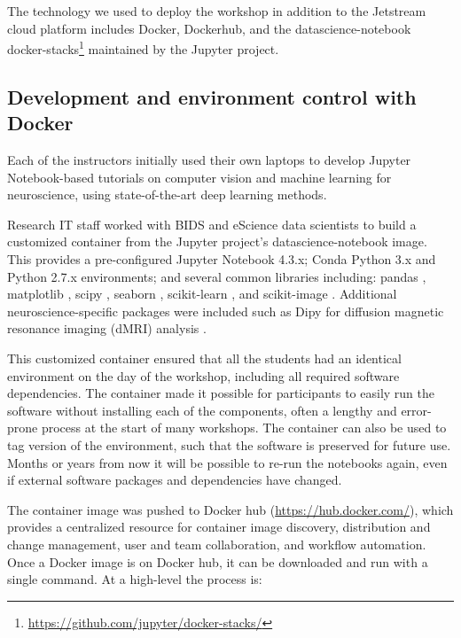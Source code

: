 The technology we used to deploy the workshop in addition to the Jetstream cloud
platform includes Docker, Dockerhub, and the datascience-notebook docker-stacks\footnote{\url{https://github.com/jupyter/docker-stacks/}}
maintained by the Jupyter project.

\subsection{Development and environment control with Docker}

Each of the instructors initially used their own laptops to develop Jupyter
Notebook-based tutorials on computer vision and machine learning for
neuroscience, using state-of-the-art deep learning methods.

Research IT staff worked with BIDS and eScience data scientists to build a
customized container from the Jupyter project's datascience-notebook image. This
provides a pre-configured Jupyter Notebook 4.3.x; Conda Python 3.x and Python
2.7.x environments; and several common libraries including: pandas
\cite{mckinney-proc-scipy-2010}, matplotlib \cite{hunter2007matplotlib}, scipy
\cite{scipy}, seaborn \cite{michael_waskom_2014_12710}, scikit-learn
\cite{Pedregosa2012-dm}, and scikit-image \cite{van2014scikit}. Additional
neuroscience-specific packages were included such as Dipy for diffusion magnetic
resonance imaging (dMRI) analysis \cite{Garyfallidis2014FrontNeuroinf}.

This customized container ensured that all the students had an identical
environment on the day of the workshop, including all required software
dependencies. The container made it possible for participants to easily run the
software without installing each of the components, often a lengthy and
error-prone process at the start of many workshops. The container can also be
used to tag version of the environment, such that the software is preserved
for future use. Months or years from now it will be possible to re-run the
notebooks again, even if external software packages and dependencies have
changed.

The container image was pushed to Docker hub (\url{https://hub.docker.com/}),
which provides a centralized resource for container image discovery,
distribution and change management, user and team collaboration, and workflow
automation. Once a Docker image is on Docker hub, it can be downloaded and run
with a single command. At a high-level the process is:

